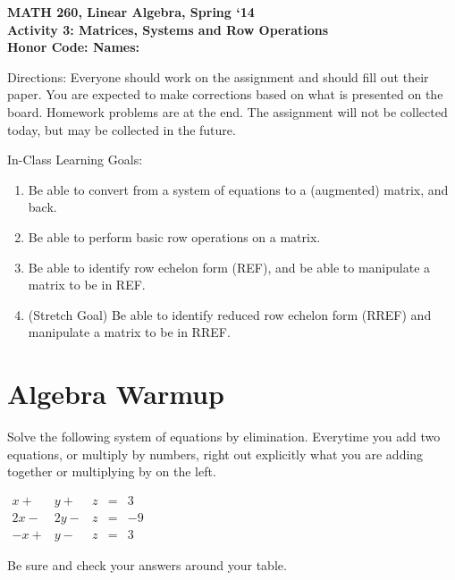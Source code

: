 \documentclass{article}
\begin{document}
\begin{flushleft}
	\bfseries{MATH 260, Linear Algebra, Spring `14}\\
	\bfseries{Activity 3:  Matrices, Systems and Row Operations}\\
	\bfseries{Honor Code:} \hspace{3.5in}\bfseries{Names:}\\
\end{flushleft}
\begin{flushleft}
\vspace{.75in}
Directions:  Everyone should work on the assignment and should fill out their paper.  You are expected to make corrections based on what is presented on the board.  Homework problems are at the end.  The assignment will not be collected today, but may be collected in the future.

\vspace{0.2in}
\Large
In-Class Learning Goals:\\
\normalsize
\begin{enumerate}
\item Be able to convert from a system of equations to a (augmented) matrix, and back.
\item Be able to perform basic row operations on a matrix.
\item Be able to identify row echelon form (REF), and be able to manipulate a matrix to be in REF.
\item (Stretch Goal) Be able to identify reduced row echelon form (RREF) and manipulate a matrix to be in RREF.
\end{enumerate}
\vspace{0.1in}
\section*{Algebra Warmup}
Solve the following system of equations by elimination. Everytime you add two equations, or multiply by numbers, right out explicitly what you are adding together or multiplying by on the left.\\
\vspace{0.25in}
\begin{center}
$\begin{array}{rrrcr}
x+&y+&z&=&3\\
2x-&2y-&z&=&-9\\
-x+&y-&z&=&3
\end{array}
$
\end{center}

\vspace{2in}
Be sure and check your answers around your table.\\
\newpage

\end{flushleft}
\end{document}
